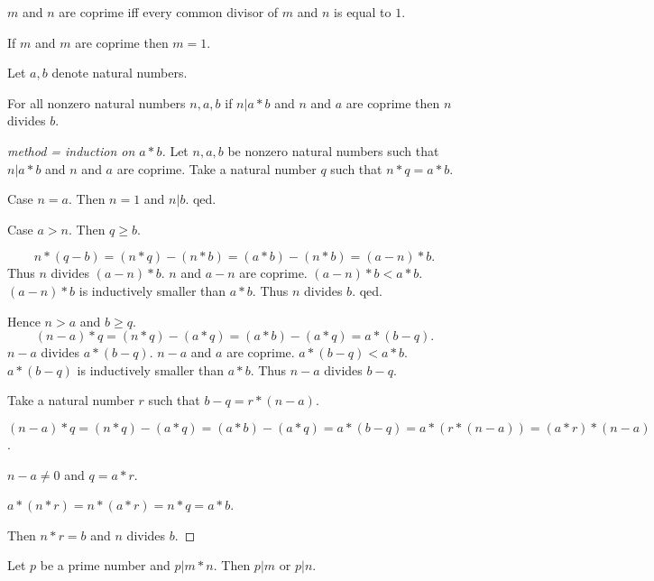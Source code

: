 \documentclass[11pt]{article}
\begin{document}
\begin{forthel}
\begin{definition}
$m$ and $n$ are coprime iff every common divisor of $m$ and $n$ is equal to $1$. 
\end{definition}

\begin{lemma}
If $m$ and $m$ are coprime then $m = 1$.
\end{lemma}

Let $a,b$ denote natural numbers.

\begin{lemma}
For all nonzero natural numbers $n,a,b$
if $n | a * b$ and $n$ and $a$ are coprime then $n$ divides $b$.
\end{lemma}

\begin{proof}[method = induction on $a * b$]

Let $n,a,b$ be nonzero natural numbers such that $n | a * b$ and $n$ and $a$ are coprime.
Take a natural number $q$ such that $n * q = a * b$.


Case $n = a$. Then $n = 1$ and $n | b$. qed.

Case $a > n$. Then $q \geq b$.

$$n * (q - b) = (n * q) - (n * b) = (a * b) - (n * b) = (a - n) * b.$$
%
Thus $n$ divides $(a - n) * b$.
$n$ and $a - n$ are coprime.
$(a - n) * b <  a * b$.
$(a - n) * b$ is inductively smaller than $a * b$.
Thus $n$ divides $b$.
qed.

Hence $n > a$ and $b \geq q$.
$$(n - a) * q = (n * q) - (a * q) = (a * b) - (a * q) = a * (b - q).$$
$n - a$ divides $a * (b - q)$.
$n - a$ and $a$ are coprime.
$a * (b - q) < a * b$.
$a * (b - q)$ is inductively smaller than $a * b$.
Thus $n - a$ divides $b - q$.

Take a natural number $r$ such that $b - q = r * (n - a)$.

$(n - a) * q = (n * q) - (a * q) = (a * b) - (a * q)
= a * (b - q) = a * (r * (n - a)) = (a * r) * (n - a)$.

$n - a \neq 0$ and $q = a * r$.

$a * (n * r) = n * (a * r) = n * q = a * b$.

Then $n * r = b$ and $n$ divides $b$.
\end{proof}

\begin{theorem}[title = Euclids Lemma]
Let $p$ be a prime number and $p | m * n$. Then $p | m$ or $p | n$.
\end{theorem}

\end{forthel}
\end{document}
